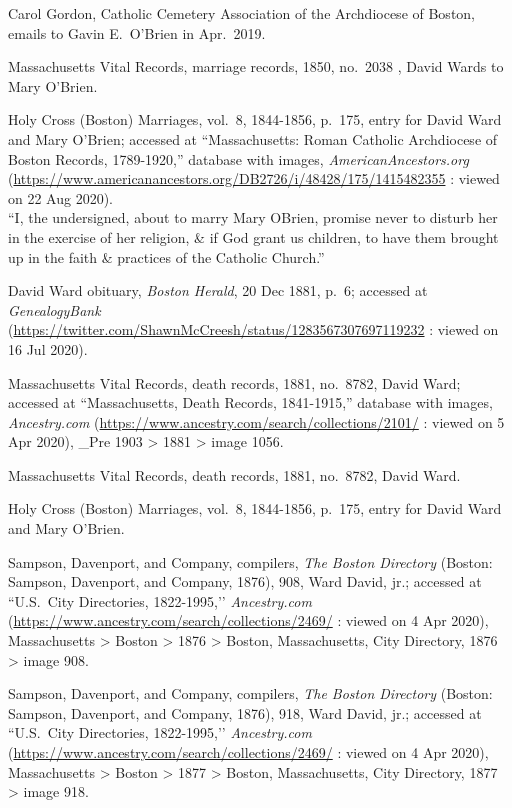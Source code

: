 \begin{thebibliography}{999}
Carol Gordon, Catholic Cemetery Association of the Archdiocese of Boston, emails to Gavin E.\ O'Brien in Apr.\ 2019.

Massachusetts Vital Records, marriage records, 1850, no.\ 2038 , David Wards to Mary O'Brien.

Holy Cross (Boston) Marriages, vol.\ 8, 1844-1856, p.\ 175, entry for David Ward and Mary O'Brien; accessed at ``Massachusetts: Roman Catholic Archdiocese of Boston Records, 1789-1920,'' database with images, \textit{AmericanAncestors.org} (\url{https://www.americanancestors.org/DB2726/i/48428/175/1415482355} : viewed on 22 Aug 2020).\\
``I, the undersigned, about to marry Mary OBrien, promise never to disturb her in the exercise of her religion, \& if God grant us children, to have them brought up in the faith \& practices of the Catholic Church.''

David Ward obituary, \textit{Boston Herald}, 20 Dec 1881, p.\ 6; accessed at \textit{GenealogyBank} (\url{https://twitter.com/ShawnMcCreesh/status/1283567307697119232} : viewed on 16 Jul 2020).

Massachusetts Vital Records, death records, 1881, no.\ 8782, David Ward; accessed at ``Massachusetts, Death Records, 1841-1915,'' database with images, \textit{Ancestry.com} (\url{https://www.ancestry.com/search/collections/2101/} : viewed on 5 Apr 2020), \_Pre 1903 > 1881 > image 1056.

Massachusetts Vital Records, death records, 1881, no.\ 8782, David Ward.

Holy Cross (Boston) Marriages, vol.\ 8, 1844-1856, p.\ 175, entry for David Ward and Mary O'Brien.

Sampson, Davenport, and Company, compilers, \textit{The Boston Directory} (Boston: Sampson, Davenport, and Company, 1876), 908, Ward David, jr.; accessed at ``U.S.\ City Directories, 1822-1995,’’ \textit{Ancestry.com} (\url{https://www.ancestry.com/search/collections/2469/} : viewed on 4 Apr 2020), Massachusetts > Boston > 1876 > Boston, Massachusetts, City Directory, 1876 > image 908.

Sampson, Davenport, and Company, compilers, \textit{The Boston Directory} (Boston: Sampson, Davenport, and Company, 1876), 918, Ward David, jr.; accessed at ``U.S.\ City Directories, 1822-1995,’’ \textit{Ancestry.com} (\url{https://www.ancestry.com/search/collections/2469/} : viewed on 4 Apr 2020), Massachusetts > Boston > 1877 > Boston, Massachusetts, City Directory, 1877 > image 918.


\end{thebibliography}
